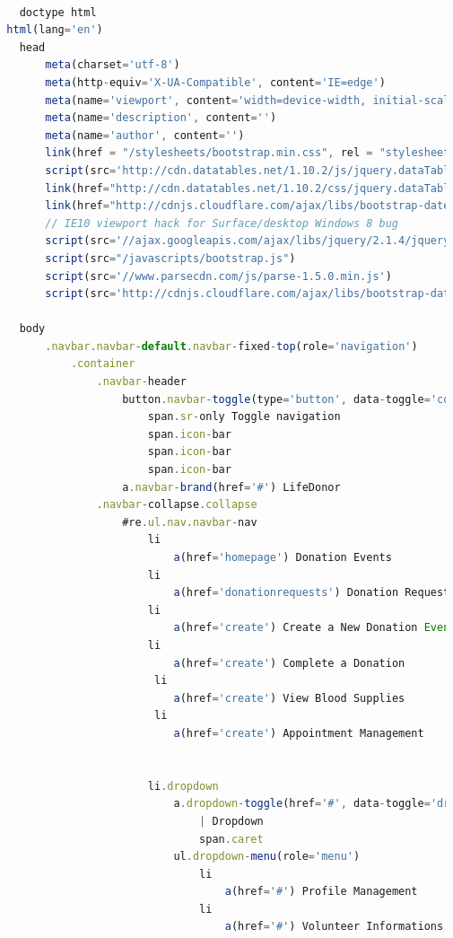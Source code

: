 	\begin{lstlisting}[language=Javascript]			
	
	doctype html
  html(lang='en')
    head
        meta(charset='utf-8')
        meta(http-equiv='X-UA-Compatible', content='IE=edge')
        meta(name='viewport', content='width=device-width, initial-scale=1')
        meta(name='description', content='')
        meta(name='author', content='')
        link(href = "/stylesheets/bootstrap.min.css", rel = "stylesheet")
        script(src='http://cdn.datatables.net/1.10.2/js/jquery.dataTables.min.js')
        link(href="http://cdn.datatables.net/1.10.2/css/jquery.dataTables.min.css",rel="stylesheet")
        link(href="http://cdnjs.cloudflare.com/ajax/libs/bootstrap-datepicker/1.3.0/css/datepicker.css",rel="stylesheet",type="text/css")
        // IE10 viewport hack for Surface/desktop Windows 8 bug
        script(src='//ajax.googleapis.com/ajax/libs/jquery/2.1.4/jquery.min.js')
        script(src="/javascripts/bootstrap.js")
        script(src='//www.parsecdn.com/js/parse-1.5.0.min.js')
        script(src='http://cdnjs.cloudflare.com/ajax/libs/bootstrap-datepicker/1.3.0/js/bootstrap-datepicker.js')

    body
        .navbar.navbar-default.navbar-fixed-top(role='navigation')
            .container
                .navbar-header
                    button.navbar-toggle(type='button', data-toggle='collapse', data-target='.navbar-collapse')
                        span.sr-only Toggle navigation
                        span.icon-bar
                        span.icon-bar
                        span.icon-bar
                    a.navbar-brand(href='#') LifeDonor
                .navbar-collapse.collapse
                    #re.ul.nav.navbar-nav
                        li
                            a(href='homepage') Donation Events
                        li
                            a(href='donationrequests') Donation Requests
                        li
                            a(href='create') Create a New Donation Event
                        li
                            a(href='create') Complete a Donation
                         li
                            a(href='create') View Blood Supplies
                         li
                            a(href='create') Appointment Management
                            
						                                                 
                        li.dropdown
                            a.dropdown-toggle(href='#', data-toggle='dropdown')
                                | Dropdown
                                span.caret
                            ul.dropdown-menu(role='menu')
                                li
                                    a(href='#') Profile Management
                                li
                                    a(href='#') Volunteer Informations


\end{lstlisting}
